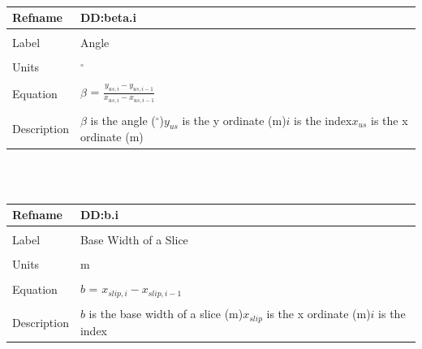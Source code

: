 \documentclass[12pt]{article}
\begin{document}
~\newline
\noindent \begin{minipage}{\textwidth}
\begin{tabular}{p{} p{}}
\toprule \textbf{Refname} & \textbf{DD:beta.i}
\label{DD:beta.i}
\\ \midrule \\
Label & Angle
\\ \midrule \\
Units & ${}^{\circ}$
\\ \midrule \\
Equation & $\beta{}$ = $\frac{{y_{us,i}}-{y_{us,i-1}}}{{x_{us,i}}-{x_{us,i-1}}}$
\\ \midrule \\
Description & $\beta{}$ is the angle (${}^{\circ}$)\newline${y_{us}}$ is the y ordinate (m)\newline$i$ is the index\newline${x_{us}}$ is the x ordinate (m)
\\ \bottomrule \end{tabular}
\end{minipage}\\
~\newline
\noindent \begin{minipage}{\textwidth}
\begin{tabular}{p{} p{}}
\toprule \textbf{Refname} & \textbf{DD:b.i}
\label{DD:b.i}
\\ \midrule \\
Label & Base Width of a Slice
\\ \midrule \\
Units & m
\\ \midrule \\
Equation & $b$ = ${x_{slip,i}}-{x_{slip,i-1}}$
\\ \midrule \\
Description & $b$ is the base width of a slice (m)\newline${x_{slip}}$ is the x ordinate (m)\newline$i$ is the index
\\ \bottomrule \end{tabular}
\end{minipage}\\
~\newline
\end{document}
